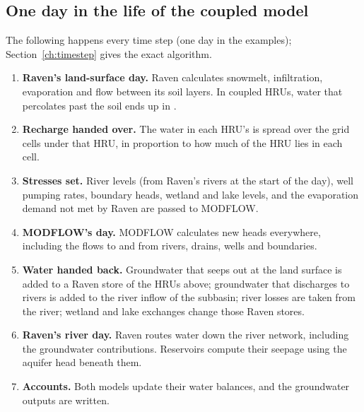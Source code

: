 \subsection{One day in the life of the coupled model}
The following happens every time step (one day in the examples); Section~\ref{ch:timestep} gives the exact algorithm.
\begin{enumerate}
\item \textbf{Raven's land-surface day.} Raven calculates snowmelt, infiltration, evaporation and flow between its soil
layers. In coupled HRUs, water that percolates past the soil ends up in .
\item \textbf{Recharge handed over.} The water in each HRU's  is spread over the grid cells under that
HRU, in proportion to how much of the HRU lies in each cell.
\item \textbf{Stresses set.} River levels (from Raven's rivers at the start of the day), well pumping rates,
boundary heads, wetland and lake levels, and the evaporation demand not met by Raven are passed to MODFLOW.
\item \textbf{MODFLOW's day.} MODFLOW calculates new heads everywhere, including the flows to and from rivers,
drains, wells and boundaries.
\item \textbf{Water handed back.} Groundwater that seeps out at the land surface is added to a Raven store of the HRUs
above; groundwater that discharges to rivers is added to the river inflow of the subbasin; river losses are taken from
the river; wetland and lake exchanges change those Raven stores.
\item \textbf{Raven's river day.} Raven routes water down the river network, including the groundwater
contributions. Reservoirs compute their seepage using the aquifer head beneath them.
\item \textbf{Accounts.} Both models update their water balances, and the groundwater outputs are written.
\end{enumerate}

